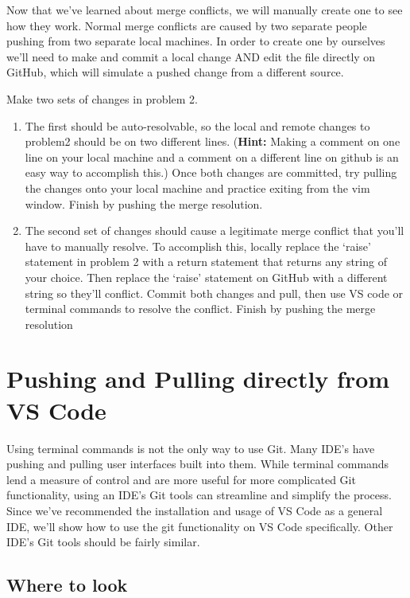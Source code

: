 Now that we've learned about merge conflicts, we will manually create one to see how they work. 
Normal merge conflicts are caused by two separate people
pushing from two separate local machines. In order to create one by ourselves we'll need to make
and commit a local change AND edit the file directly on GitHub, which will simulate a pushed change
from a different source.

\begin{problem}
    Make two sets of changes in problem 2.
    \begin{enumerate}
        \item The first should be auto-resolvable, so the local and remote changes to problem2 should be on two different lines. 
        (\textbf{Hint:} Making a comment on one line on your local machine and a comment on a different line on github is an easy 
        way to accomplish  this.) Once both changes are committed, try pulling the changes onto your local
        machine and practice exiting from the vim window. Finish by pushing the merge resolution.
        \item The second set of changes should cause a legitimate merge conflict that you'll have to manually resolve. To accomplish this, 
        locally replace the `raise' statement in problem 2 with a return statement that returns any string of your choice. 
        Then replace the `raise' statement on GitHub with a different string so they'll conflict. 
        Commit both changes and pull, then use VS code or terminal commands to resolve the conflict. Finish by pushing the merge resolution
    \end{enumerate}
\end{problem}

\section{Pushing and Pulling directly from VS Code}

Using terminal commands is not the only way to use Git. Many IDE's have pushing and pulling user interfaces built into them. While terminal commands lend a 
measure of control and are more useful for more complicated Git functionality, using an IDE's Git tools can streamline and simplify the process. Since we've
recommended the installation and usage of VS Code as a general IDE, we'll show how to use the git functionality on VS Code specifically. Other IDE's 
Git tools should be fairly similar.

\subsection{Where to look}

